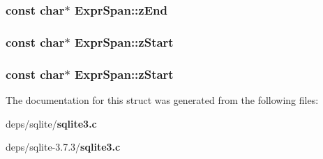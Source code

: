 \subsubsection{\setlength{\rightskip}{0pt plus 5cm}const char$\ast$ \bf{Expr\-Span::z\-End}}\label{structExprSpan_1fe6f556413359ab7874517cfbf3c8ff}


\subsubsection{\setlength{\rightskip}{0pt plus 5cm}const char$\ast$ \bf{Expr\-Span::z\-Start}}\label{structExprSpan_7fc188499b6de11facf1d8f4e94e65f2}


\subsubsection{\setlength{\rightskip}{0pt plus 5cm}const char$\ast$ \bf{Expr\-Span::z\-Start}}\label{structExprSpan_7fc188499b6de11facf1d8f4e94e65f2}




The documentation for this struct was generated from the following files:\begin{CompactItemize}
\item 
deps/sqlite/\bf{sqlite3.c}\item 
deps/sqlite-3.7.3/\bf{sqlite3.c}\end{CompactItemize}
